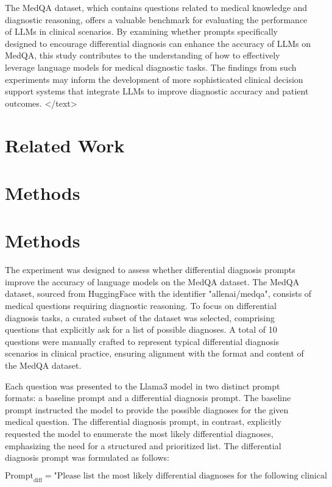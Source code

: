 \documentclass{article}
\begin{document}
The MedQA dataset, which contains questions related to medical knowledge and diagnostic reasoning, offers a valuable benchmark for evaluating the performance of LLMs in clinical scenarios. By examining whether prompts specifically designed to encourage differential diagnosis can enhance the accuracy of LLMs on MedQA, this study contributes to the understanding of how to effectively leverage language models for medical diagnostic tasks. The findings from such experiments may inform the development of more sophisticated clinical decision support systems that integrate LLMs to improve diagnostic accuracy and patient outcomes.
</text>
\section{Related Work}

\section{Methods}
\section{Methods}

The experiment was designed to assess whether differential diagnosis prompts improve the accuracy of language models on the MedQA dataset. The MedQA dataset, sourced from HuggingFace with the identifier "allenai/medqa", consists of medical questions requiring diagnostic reasoning. To focus on differential diagnosis tasks, a curated subset of the dataset was selected, comprising questions that explicitly ask for a list of possible diagnoses. A total of 10 questions were manually crafted to represent typical differential diagnosis scenarios in clinical practice, ensuring alignment with the format and content of the MedQA dataset.

Each question was presented to the Llama3 model in two distinct prompt formats: a baseline prompt and a differential diagnosis prompt. The baseline prompt instructed the model to provide the possible diagnoses for the given medical question. The differential diagnosis prompt, in contrast, explicitly requested the model to enumerate the most likely differential diagnoses, emphasizing the need for a structured and prioritized list. The differential diagnosis prompt was formulated as follows:

$$
\text{Prompt}_{\text{diff}} = \text{"Please list the most likely differential diagnoses for the following clinical scenario: "}
$$
\end{document}
